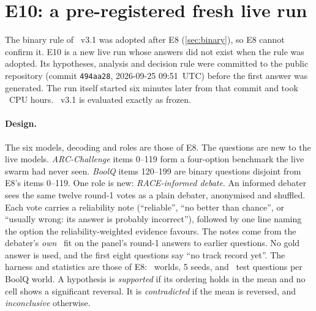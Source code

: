\section{E10: a pre-registered fresh live run}\label{sec:live2}

The binary rule of \race\ v3.1 was adopted after E8 (\cref{sec:binary}), so E8 cannot confirm it. E10 is a new live run whose answers did not exist when the rule was adopted. Its hypotheses, analysis and decision rule were committed to the public repository (commit \texttt{494aa28}, 2026-09-25 09:51~UTC) before the first answer was generated. The run itself started six minutes later from that commit and took \computeLiveTwoHours\ CPU hours. \race\ v3.1 is evaluated exactly as frozen.

\paragraph{Design.} The six models, decoding and roles are those of E8. The questions are new to the live models. \emph{ARC-Challenge} items 0--119 form a four-option benchmark the live swarm had never seen. \emph{BoolQ} items 120--199 are binary questions disjoint from E8's items 0--119. One role is new: \emph{RACE-informed debate}. An informed debater sees the same twelve round-1 votes as a plain debater, anonymised and shuffled. Each vote carries a reliability note (``reliable'', ``no better than chance'', or ``usually wrong: its answer is probably incorrect''), followed by one line naming the option the reliability-weighted evidence favours. The notes come from the debater's \emph{own} \race\ fit on the panel's round-1 answers to earlier questions. No gold answer is used, and the first eight questions say ``no track record yet''. The harness and statistics are those of E8: \nWorldsLiveTwo\ worlds, 5 seeds, and \nLiveTwoTestTasks\ test questions per BoolQ world. A hypothesis is \emph{supported} if its ordering holds in the mean and no cell shows a significant reversal. It is \emph{contradicted} if the mean is reversed, and \emph{inconclusive} otherwise.

\begin{table}[t]
\centering\small
\caption{\textbf{E10.} The pre-registered hypotheses and their outcomes. Target and baseline are mean honest-agent accuracy (\%) over the registered cells. W/T/L: significant wins, ties and losses of the target over the cells (Holm-corrected Wilcoxon test and paired bootstrap interval must agree). H3 is paired over (model, question), with the two benchmarks as its cells.}\label{tab:e10}

\end{table}

